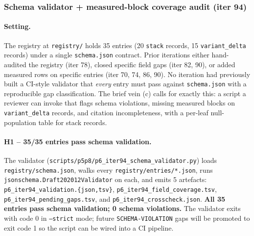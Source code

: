 
\subsubsection{Schema validator + measured-block coverage audit (iter 94)}
\label{sec:p6-iter94-schema-validator}

\paragraph{Setting.}
The registry at \texttt{registry/} holds 35 entries (20 \texttt{stack} records,
15 \texttt{variant\_delta} records) under a single \texttt{schema.json} contract.
Prior iterations either hand-audited the registry (iter 78), closed specific
field gaps (iter 82, 90), or added measured rows on specific entries (iter 70,
74, 86, 90). No iteration had previously built a CI-style validator that
\emph{every} entry must pass against \texttt{schema.json} with a reproducible
gap classification. The brief vein (c) calls for exactly this: a script a
reviewer can invoke that flags schema violations, missing measured blocks on
\texttt{variant\_delta} records, and citation incompleteness, with a per-leaf
null-population table for stack records.

\paragraph{H1 -- 35/35 entries pass schema validation.}
The validator (\texttt{scripts/p5p8/p6\_iter94\_schema\_validator.py}) loads
\texttt{registry/schema.json}, walks every \texttt{registry/entries/*.json},
runs \texttt{jsonschema.Draft202012Validator} on each, and emits 5 artefacts:
\texttt{p6\_iter94\_validation.\{json,tsv\}}, \texttt{p6\_iter94\_field\_coverage.tsv},
\texttt{p6\_iter94\_pending\_gaps.tsv}, and \texttt{p6\_iter94\_crosscheck.json}.
\textbf{All 35 entries pass schema validation; 0 schema violations.}
The validator exits with code 0 in \texttt{--strict} mode; future
\texttt{SCHEMA-VIOLATION} gaps will be promoted to exit code 1 so the script
can be wired into a CI pipeline.

